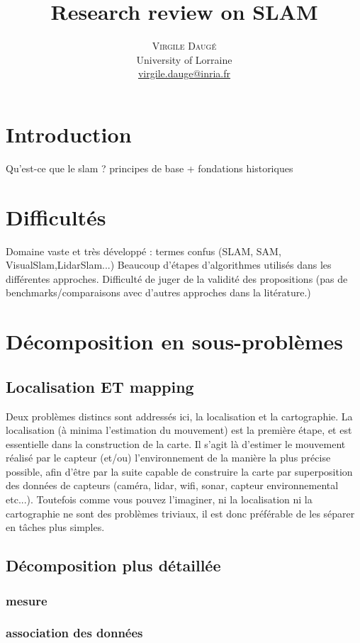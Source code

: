 \documentclass[twoside,twocolumn]{article}
\title{Research review on SLAM}
\author{%
\textsc{Virgile Daugé}  \\[1ex] %
\normalsize University of Lorraine \\ %
\normalsize \href{mailto:virgile.dauge@inria.fr}{virgile.dauge@inria.fr} %
}
\begin{document}
\maketitle

\section{Introduction}
Qu'est-ce que le slam ?
principes de base + fondations historiques

\section{Difficultés}
Domaine vaste et très développé :
termes confus (SLAM, SAM, VisualSlam,LidarSlam...)
Beaucoup d'étapes d'algorithmes utilisés dans les différentes approches.
Difficulté de juger de la validité des propositions (pas de benchmarks/comparaisons avec d'autres approches dans la litérature.)

\section{Décomposition en sous-problèmes}
\subsection{Localisation ET mapping}
Deux problèmes distincs sont addressés ici, la localisation et la cartographie.
La localisation (à minima l'estimation du mouvement) est la première étape,
et est essentielle dans la construction de la carte.
Il s'agit là d'estimer le mouvement réalisé par le capteur (et/ou)
l'environnement de la manière la plus précise possible, afin d'être par la
suite capable de construire la carte par superposition des données de capteurs
(caméra, lidar, wifi, sonar, capteur environnemental etc...).
Toutefois comme vous pouvez l'imaginer, ni la localisation ni la cartographie
ne sont des problèmes triviaux, il est donc préférable de les séparer en tâches
plus simples.
\subsection{Décomposition plus détaillée}
\subsubsection{mesure}
\subsubsection{association des données}
\end{document}
